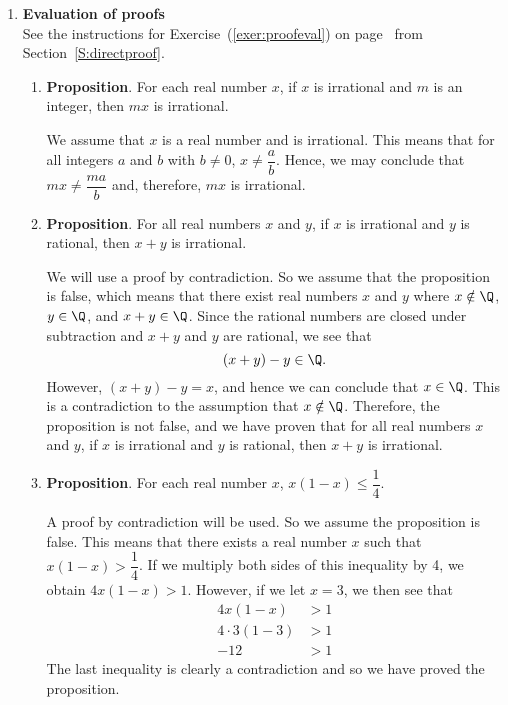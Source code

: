 \begin{enumerate}
\item \textbf{Evaluation of proofs}  \hfill \\
See the instructions for Exercise~(\ref{exer:proofeval}) on 
page~\pageref{exer:proofeval} from Section~\ref{S:directproof}.

\begin{enumerate}
\item \textbf{Proposition}.  For each real number $x$, if $x$ is irrational and $m$ is an integer, then $mx$ is irrational.

\begin{myproof}
We assume that $x$ is a real number and is irrational.  This means that for all integers $a$ and $b$ with $b \ne 0$, $x \ne \dfrac{a}{b}$.  Hence, we may conclude that $mx \ne \dfrac{ma}{b}$ and, therefore, $mx$ is irrational.
\end{myproof}

\item \textbf{Proposition}.  For all real numbers $x$ and $y$, if $x$ is irrational and $y$ is rational, then $x + y$ is irrational.

\begin{myproof}
We will use a proof by contradiction.  So we assume that the proposition is false, which means that there exist real numbers $x$ and $y$ where $x \notin \Q$, $y \in \Q$, and $x + y \in \Q$.  Since the rational numbers are closed under subtraction and $x+y$ and $y$ are rational, we see that
\[
\left(x + y \right) - y \in \Q.
\]
However, $\left( x + y \right) - y = x$, and hence we can conclude that $x \in \Q$.  This is a contradiction to the assumption that $x \notin \Q$.  Therefore, the proposition is not false, and we have proven that for all real numbers $x$ and $y$, if $x$ is irrational and $y$ is rational, then $x + y$ is irrational. 
\end{myproof}


\item \textbf{Proposition}.  For each real number $x$, $x (1 - x) \leq \dfrac{1}{4}$.

\begin{myproof}
A proof by contradiction will be used.  So we assume the proposition is false.  This means that there exists a real number $x$ such that $x (1 - x) > \dfrac{1}{4}$.  If we multiply both sides of this inequality by 4, we obtain
 $4x (1 - x) > 1$.
However, if we let $x = 3$, we then see that
\begin{align*}
4x (1 - x) &> 1 \\
4 \cdot 3 (1 - 3) &> 1 \\
-12 &> 1
\end{align*}
The last inequality is clearly  a contradiction and so we have proved the proposition.
\end{myproof}
\end{enumerate}
\end{enumerate}


